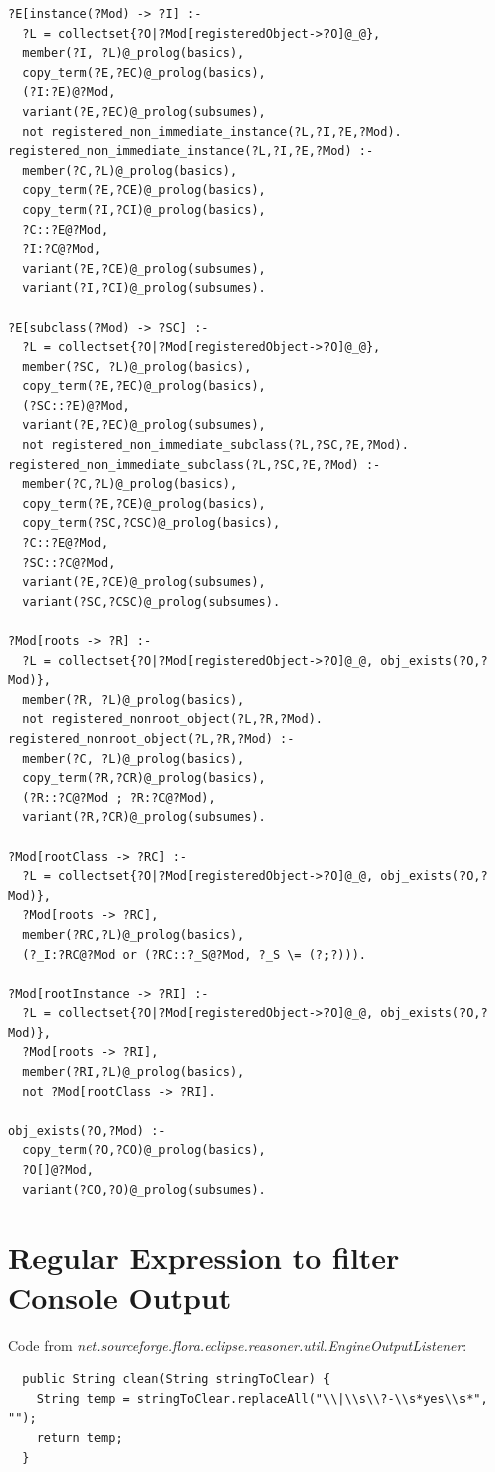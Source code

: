 \documentclass[a4paper,11pt]{article}
\begin{document}
\begin{verbatim}
?E[instance(?Mod) -> ?I] :-
  ?L = collectset{?O|?Mod[registeredObject->?O]@_@},
  member(?I, ?L)@_prolog(basics),
  copy_term(?E,?EC)@_prolog(basics),
  (?I:?E)@?Mod,
  variant(?E,?EC)@_prolog(subsumes),
  not registered_non_immediate_instance(?L,?I,?E,?Mod).
registered_non_immediate_instance(?L,?I,?E,?Mod) :-
  member(?C,?L)@_prolog(basics),
  copy_term(?E,?CE)@_prolog(basics),
  copy_term(?I,?CI)@_prolog(basics),
  ?C::?E@?Mod,
  ?I:?C@?Mod,
  variant(?E,?CE)@_prolog(subsumes),
  variant(?I,?CI)@_prolog(subsumes).

?E[subclass(?Mod) -> ?SC] :-
  ?L = collectset{?O|?Mod[registeredObject->?O]@_@},
  member(?SC, ?L)@_prolog(basics),
  copy_term(?E,?EC)@_prolog(basics),
  (?SC::?E)@?Mod,
  variant(?E,?EC)@_prolog(subsumes),
  not registered_non_immediate_subclass(?L,?SC,?E,?Mod).
registered_non_immediate_subclass(?L,?SC,?E,?Mod) :-
  member(?C,?L)@_prolog(basics),
  copy_term(?E,?CE)@_prolog(basics),
  copy_term(?SC,?CSC)@_prolog(basics),
  ?C::?E@?Mod,
  ?SC::?C@?Mod,
  variant(?E,?CE)@_prolog(subsumes),
  variant(?SC,?CSC)@_prolog(subsumes).

?Mod[roots -> ?R] :-
  ?L = collectset{?O|?Mod[registeredObject->?O]@_@, obj_exists(?O,?Mod)},
  member(?R, ?L)@_prolog(basics),
  not registered_nonroot_object(?L,?R,?Mod).
registered_nonroot_object(?L,?R,?Mod) :-
  member(?C, ?L)@_prolog(basics),
  copy_term(?R,?CR)@_prolog(basics),
  (?R::?C@?Mod ; ?R:?C@?Mod),
  variant(?R,?CR)@_prolog(subsumes).

?Mod[rootClass -> ?RC] :-
  ?L = collectset{?O|?Mod[registeredObject->?O]@_@, obj_exists(?O,?Mod)},
  ?Mod[roots -> ?RC],
  member(?RC,?L)@_prolog(basics),
  (?_I:?RC@?Mod or (?RC::?_S@?Mod, ?_S \= (?;?))).

?Mod[rootInstance -> ?RI] :-
  ?L = collectset{?O|?Mod[registeredObject->?O]@_@, obj_exists(?O,?Mod)},
  ?Mod[roots -> ?RI],
  member(?RI,?L)@_prolog(basics),
  not ?Mod[rootClass -> ?RI].

obj_exists(?O,?Mod) :-
  copy_term(?O,?CO)@_prolog(basics),
  ?O[]@?Mod,
  variant(?CO,?O)@_prolog(subsumes).
\end{verbatim}


\section{Regular Expression to filter Console Output}
\label{appendix:filterRegExp}
Code from \emph{net.sourceforge.flora.eclipse.reasoner.util.EngineOutputListener}:
\begin{verbatim}
  public String clean(String stringToClear) {
    String temp = stringToClear.replaceAll("\\|\\s\\?-\\s*yes\\s*", "");
    return temp;
  }
\end{verbatim}
\end{document}
